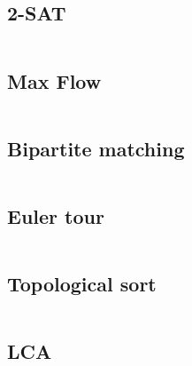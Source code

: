 \subsection{2-SAT}
\inputminted[frame=single,framesep=3pt,breaklines=true,tabsize=2,linenos,label=O(E+V)]{c++}{graph/two-sat.cpp}

\subsection{Max Flow}
\inputminted[frame=single,framesep=3pt,breaklines=true,tabsize=2,linenos,label=O($V^2 E$)]{c++}{graph/max-flow.cpp}

\subsection{Bipartite matching}
\inputminted[frame=single,framesep=3pt,breaklines=true,tabsize=2,linenos,label=O($V^2 E$)]{c++}{graph/bipartite-matching.cpp}

\subsection{Euler tour}
\inputminted[frame=single,framesep=3pt,breaklines=true,tabsize=2,linenos,label=O($V^2 E$)]{c++}{graph/euler-tour.cpp}

\subsection{Topological sort}
\inputminted[frame=single,framesep=3pt,breaklines=true,tabsize=2,linenos,label=O(E+V)]{c++}{graph/topo-sort.cpp}

\subsection{LCA}
\inputminted[frame=single,framesep=3pt,breaklines=true,tabsize=2,linenos,label=O(E+V)]{c++}{graph/lca.cpp}